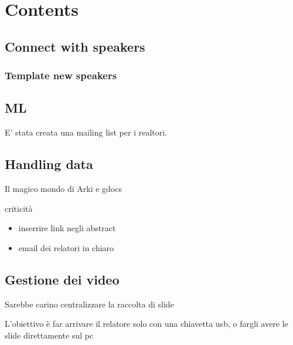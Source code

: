 \section{Contents}


\subsection{Connect with speakers}

\subsubsection{Template new speakers}



\subsection{ML}
E' stata creata una mailing list per i realtori.



\subsection{Handling data}
Il magico mondo di Arki e gdocs

criticit\`a
\begin{itemize}
\item inserrire link negli abstract
\item email dei relatori in chiaro
\end{itemize}




\subsection{Gestione dei video}


Sarebbe carino centralizzare la raccolta di slide 

L'obiettivo è far arrivare il relatore solo con una chiavetta usb, o fargli avere le slide direttamente sul pc 



